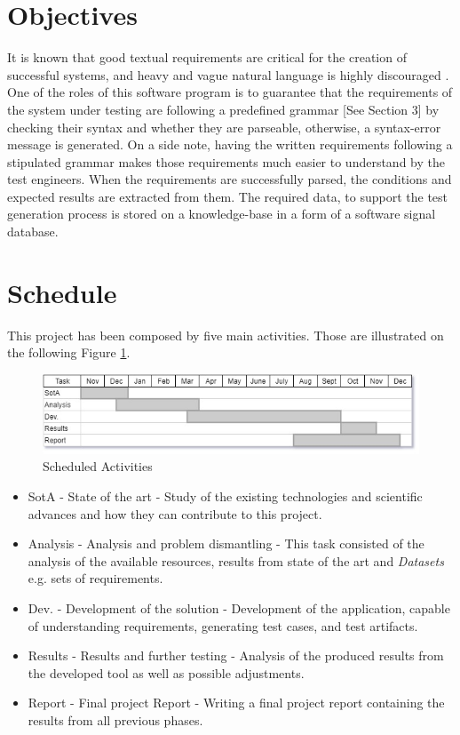 \section{Objectives}
\label{sec:objectives}
It is known that good textual requirements are critical for the creation of successful systems, and heavy and vague natural language is highly discouraged \cite{incose}.
One of the roles of this software program is to guarantee that the requirements of the system under testing are following a predefined grammar [See Section 3] by checking their syntax and whether they are parseable, otherwise, a syntax-error message is generated. On a side note, having the written requirements following a stipulated grammar makes those requirements much easier to understand by the test engineers.
When the requirements are successfully parsed, the conditions and expected results are extracted from them. The required data, to support the test generation process is stored on a knowledge-base in a form of a software signal database.


\section{Schedule}
\label{sec:schedule}
This project has been composed by five main activities. Those are illustrated on the following Figure \ref{fig:schedule}.

\begin{figure}[h]
    \centering
    \includegraphics[width=\textwidth]{images/gantt.jpg}
    \caption{Scheduled Activities}
    \label{fig:schedule}
\end{figure}

\begin{itemize}
    \item SotA - State of the art - Study of the existing technologies and scientific advances and how they can contribute to this project.
    \item Analysis - Analysis and problem dismantling - This task consisted of the analysis of the available resources, results from state of the art and \textit{Datasets} e.g. sets of requirements.
    \item Dev. - Development of the solution - Development of the application, capable of understanding requirements, generating test cases, and test artifacts.
    \item Results - Results and further testing - Analysis of the produced results from the developed tool as well as possible adjustments.
    \item Report - Final project Report - Writing a final project report containing the results from all previous phases.
\end{itemize}

